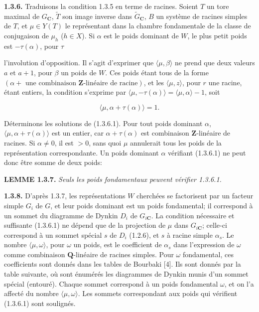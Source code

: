 \documentclass[10pt,a4paper]{article}
\newcommand{\SourcePage}[2]{\clearpage\setcounter{page}{#2}\typeout{D031_SOURCE_PAGE physical=#1 printed=#2}}
\begin{document}
\textbf{1.3.6.} Traduisons la condition 1.3.5 en terme de racines. Soient \(T\) un tore maximal de \(G_{\mathbf C}\), \(\widetilde T\) son image inverse dans \(\widetilde G_{\mathbf C}\), \(B\) un système de racines simples de \(T\), et \(\mu\in Y(T)\) le représentant dans la chambre fondamentale de la classe de conjugaison de \(\mu_h\) (\(h\in X\)). Si \(\alpha\) est le poids dominant de \(W\), le plus petit poids est \(-\tau(\alpha)\), pour \(\tau\)

\SourcePage{15}{261}
l'involution d'opposition. Il s'agit d'exprimer que \(\langle\mu,\beta\rangle\) ne prend que deux valeurs \(a\) et \(a+1\), pour \(\beta\) un poids de \(W\). Ces poids étant tous de la forme \((\alpha+\text{ une combinaison }\mathbf Z\text{-linéaire de racine})\), et les \(\langle\mu,z\rangle\), pour \(r\) une racine, étant entiers, la condition s'exprime par \(\langle\mu,-\tau(\alpha)\rangle=\langle\mu,\alpha\rangle-1\), soit

\[
\langle\mu,\alpha+\tau(\alpha)\rangle=1. \tag{1.3.6.1}
\]

Déterminons les solutions de (1.3.6.1). Pour tout poids dominant \(\alpha\), \(\langle\mu,\alpha+\tau(\alpha)\rangle\) est un entier, car \(\alpha+\tau(\alpha)\) est combinaison \(\mathbf Z\)-linéaire de racines. Si \(\alpha\ne0\), il est \(>0\), sans quoi \(\mu\) annulerait tous les poids de la représentation correspondante. Un poids dominant \(\alpha\) vérifiant (1.3.6.1) ne peut donc être somme de deux poids:

\textbf{LEMME 1.3.7.} \emph{Seuls les poids fondamentaux peuvent vérifier 1.3.6.1.}

\textbf{1.3.8.} D'après 1.3.7, les représentations \(W\) cherchées se factorisent par un facteur simple \(G_i\) de \(G\), et leur poids dominant est un poids fondamental; il correspond à un sommet du diagramme de Dynkin \(D_i\) de \(G_{i\mathbf C}\). La condition nécessaire et suffisante (1.3.6.1) ne dépend que de la projection de \(\mu\) dans \(G_{i\mathbf C}\); celle-ci correspond à un sommet spécial \(s\) de \(D_i\) (1.2.6), et \(s\) à racine simple \(\alpha_s\). Le nombre \(\langle\mu,\omega\rangle\), pour \(\omega\) un poids, est le coefficient de \(\alpha_s\) dans l'expression de \(\omega\) comme combinaison \(\mathbf Q\)-linéaire de racines simples. Pour \(\omega\) fondamental, ces coefficients sont donnés dans les tables de Bourbaki {[}4{]}. Ils sont donnés par la table suivante, où sont énumérés les diagrammes de Dynkin munis d'un sommet spécial (entouré). Chaque sommet correspond à un poids fondamental \(\omega\), et on l'a affecté du nombre \(\langle\mu,\omega\rangle\). Les sommets correspondant aux poids qui vérifient (1.3.6.1) sont soulignés.
\end{document}
